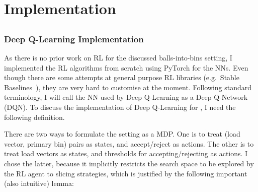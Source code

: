 \chapter{Implementation}\label{implementation}

\ifpdf
    \graphicspath{{Chapter3/Figs/Raster/}{Chapter3/Figs/PDF/}{Chapter3/Figs/}}
\else
    \graphicspath{{Chapter3/Figs/Vector/}{Chapter3/Figs/}}
\fi



\section{\TwoThinning}





\subsection{Deep Q-Learning Implementation} \label{dqn-implmentation-two-thinning}


As there is no prior work on RL for the discussed balls-into-bins setting, I implemented the RL algorithms from scratch using PyTorch for the NNs. Even though there are some attempts at general purpose RL libraries (e.g.\ Stable Baselines~\cite{hill2018stablebaselines}), they are very hard to customise at the moment. Following standard terminology, I will call the NN used by Deep Q-Learning as a Deep Q-Network (DQN). To discuss the implementation of Deep Q-Learning for \TwoThinning, I need the following definition.


There are two ways to formulate the \TwoThinning setting as a MDP. One is to treat (load vector, primary bin) pairs as states, and accept/reject as actions. The other is to treat load vectors as states, and thresholds for accepting/rejecting as actions. I chose the latter, because it implicitly restricts the search space to be explored by the RL agent to slicing strategies, which is justified by the following important (also intuitive) lemma:


